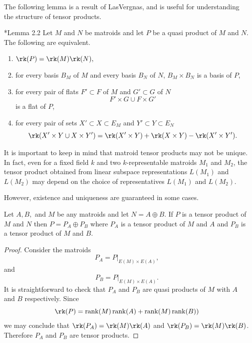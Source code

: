     The following lemma is a result of LasVergnas, and is useful for understanding the structure of tensor products.
    \begin{lemma}\label{lem:tensorCharacterizations}\cite{LV81}*{Lemma 2.2}
    Let $M$ and $N$ be matroids and let $P$ be a quasi product of $M$ and $N$. The following are equivalent.
    \begin{enumerate}
        \item $\rk(P)=\rk(M)\rk(N),$
        \item for every basis $B_M$ of $M$ and every basis $B_N$ of $N$, $B_M\times B_N$ is a basis of $P$,
        \item for every pair of flats $F'\subset F$ of $M$ and $G'\subset G$ of $N$ 
        $$F'\times G \cup F\times G'$$
        is a flat of $P$,
        \item for every pair of sets $X'\subset X\subset E_M$ and $Y'\subset Y\subset E_N$
        $$\rk(X'\times Y\cup X\times Y')= \rk(X'\times Y)+\rk(X\times Y)- \rk(X'\times Y').$$
    \end{enumerate}
    \end{lemma}
    It is important to keep in mind that matroid tensor products may not be unique. In fact, even for a fixed field $k$ and two $k$-representable matroids $M_1$ and $M_2$, the tensor product obtained from linear subspace representations $L(M_1)$ and $L(M_2)$ may depend on the choice of representatives $L(M_1)$ and $L(M_2)$. 

    However, existence and uniqueness are guaranteed in some cases.

    \begin{lemma}\label{lem:tensorSums}
     Let $A,B,$ and $M$ be any matroids and let $N=A\oplus B$. If $P$ is a tensor product of $M$ and $N$ then $P= P_A\oplus P_B$ where $P_A$ is a tensor product of $M$ and $A$ and $P_B$ is a tensor product of $M$ and $B$.
    \end{lemma}
    \begin{proof}
        Consider the matroids 
        $$P_A = P|_{E(M)\times E(A)},$$
        and
        $$P_B = P|_{E(M)\times E(A)}.$$
        It is straightforward to check that $P_A$ and $P_B$ are quasi products of $M$ with $A$ and $B$ respectively. Since
        $$\rk(P)=\rank(M)\rank(A)+\rank(M)\rank(B))$$
        we may conclude that $\rk(P_A)=\rk(M)\rk(A)$ and $\rk(P_B)= \rk(M)\rk(B)$. Therefore $P_A$ and $P_B$ are tensor products. 
    \end{proof}

